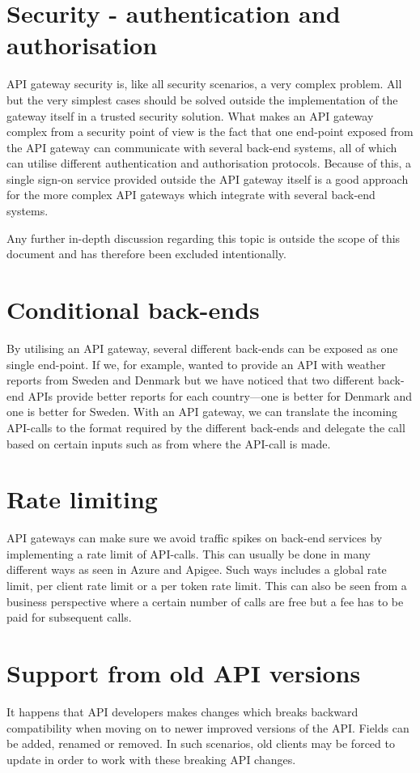 \documentclass{cslthse-msc}
\begin{document}
\section{Security - authentication and authorisation}
\label{sec:security}
API gateway security is, like all security scenarios, a very complex problem. All but the very simplest cases should be solved outside the implementation of the gateway itself in a trusted security solution. What makes an API gateway complex from a security point of view is the fact that one end-point exposed from the API gateway can communicate with several back-end systems, all of which can utilise different authentication and authorisation protocols. Because of this, a single sign-on service provided outside the API gateway itself is a good approach for the more complex API gateways which integrate with several back-end systems.

Any further in-depth discussion regarding this topic is outside the scope of this document and has therefore been excluded intentionally.

\section{Conditional back-ends}
By utilising an API gateway, several different back-ends can be exposed as one single end-point. If we, for example, wanted to provide an API with weather reports from Sweden and Denmark but we have noticed that two different back-end APIs provide better reports for each country---one is better for Denmark and one is better for Sweden. With an API gateway, we can translate the incoming API-calls to the format required by the different back-ends and delegate the call based on certain inputs such as from where the API-call is made.

\section{Rate limiting}
API gateways can make sure we avoid traffic spikes on back-end services by implementing a rate limit of API-calls. This can usually be done in many different ways as seen in Azure\cite{azure_rate_limit} and Apigee\cite{apigee_rate_limit}. Such ways includes a global rate limit, per client rate limit or a per token rate limit. This can also be seen from a business perspective where a certain number of calls are free but a fee has to be paid for subsequent calls.

\section{Support from old API versions}
It happens that API developers makes changes which breaks backward compatibility when moving on to newer improved versions of the API. Fields can be added, renamed or removed. In such scenarios, old clients may be forced to update in order to work with these breaking API changes.
\end{document}
